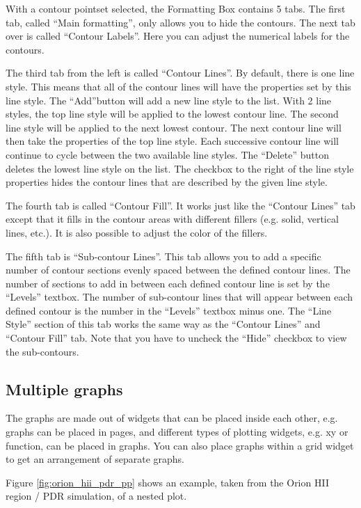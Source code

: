 With a contour pointset selected, the Formatting Box contains 5 tabs. The 
first tab, called ``Main formatting'', only allows you to hide the contours.
The next tab over is called ``Contour Labels''. 
Here you can adjust the numerical labels for the contours.

The third tab from the left is called ``Contour Lines''. By default, there is one line style. 
This means that all of the contour lines will have the properties set by this line style. 
The ``Add''button will add a new line style to the list. With 2 line styles, 
the top line style will be applied to the lowest contour line. The second line style 
will be applied to the next lowest contour. The next contour line will then 
take the properties of the top line style. Each successive contour line will 
continue to cycle between the two available line styles. The ``Delete'' 
button deletes the lowest line style on the list. The checkbox to the right 
of the line style properties hides the contour lines that are described by 
the given line style.

The fourth tab is called ``Contour Fill''. It works just like the ``Contour Lines'' tab except
that it fills in the contour areas with different fillers (e.g. solid, vertical lines, etc.). It is also possible
to adjust the color of the fillers.

The fifth tab is ``Sub-contour Lines''. This tab allows you to add a specific number of contour sections evenly spaced between the defined
contour lines. The number of sections to add in between each defined contour line is set by the ``Levels'' textbox. The number of sub-contour lines that will appear between each defined contour is the number in the ``Levels'' textbox minus one. The ``Line Style'' section
of this tab works the same way as the ``Contour Lines'' and ``Contour Fill'' tab. Note that you have to uncheck the ``Hide'' checkbox to view
the sub-contours.

\subsection{Multiple graphs}

The graphs are made out of widgets that can be placed inside each other, e.g. 
graphs can be placed in pages, and different types of plotting widgets, e.g. xy or function, 
can be placed in graphs. 
You can also place graphs within a grid widget to get an arrangement of separate graphs.

Figure \ref{fig:orion_hii_pdr_pp} shows an example, 
taken from the Orion HII region / PDR simulation, of a nested plot.

